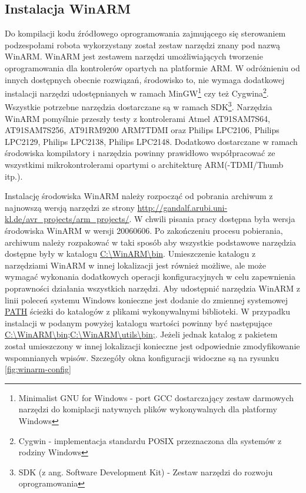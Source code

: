\subsection{Instalacja WinARM}
Do kompilacji kodu źródłowego oprogramowania zajmującego się sterowaniem
podzespołami robota wykorzystany został zestaw narzędzi znany pod nazwą WinARM.
WinARM jest zestawem narzędzi umożliwiających tworzenie oprogramowania dla
kontrolerów opartych na platformie ARM. W odróżnieniu od innych dostępnych
obecnie rozwiązań, środowisko to, nie wymaga dodatkowej instalacji narzędzi
udostępnianych w ramach MinGW\footnote{Minimalist GNU for Windows - port GCC
dostarczający zestaw darmowych narzędzi do komiplacji natywnych plików
wykonywalnych dla platformy Windows} czy też Cygwina\footnote{Cygwin -
implementacja standardu POSIX przeznaczona dla systemów z rodziny Windows}.
Wszystkie potrzebne narzędzia dostarczane są w ramach SDK\footnote{SDK (z ang.
Software Development Kit) - Zestaw narzędzi do rozwoju oprogramowania}. Narzędzia
WinARM pomyślnie przeszły testy z kontrolerami Atmel AT91SAM7S64, AT91SAM7S256,
AT91RM9200 ARM7TDMI oraz Philips LPC2106, Philips LPC2129, Philips LPC2138,
Philips LPC2148. Dodatkowo dostarczane w ramach środowiska kompilatory i
narzędzia powinny prawidłowo współpracować ze wszystkimi mikrokontrolerami
opartymi o architekturę ARM(-TDMI/Thumb itp.).

Instalację środowiska WinARM należy rozpocząć od pobrania archiwum z najnowszą
wersją narzędzi ze strony
\url{http://gandalf.arubi.uni-kl.de/avr_projects/arm_projects/}. W chwili pisania
pracy dostępna była wersja środowiska WinARM w wersji 20060606. Po zakończeniu
procesu pobierania, archiwum należy rozpakować w taki sposób aby wszystkie
podstawowe narzędzia dostępne były w katalogu \url{C:\WinARM\bin}. Umieszczenie
katalogu z narzędziami WinARM w innej lokalizacji jest również możliwe, ale może
wymagać wykonania dodatkowych operacji konfiguracyjnych w celu zapewnienia
poprawności działania wszystkich narzędzi. Aby udostępnić narzędzia WinARM z
linii poleceń systemu Windows konieczne jest dodanie do zmiennej systemowej
\url{PATH} ścieżki do katalogów z plikami wykonywalnymi biblioteki. W przypadku
instalacji w podanym powyżej katalogu wartości powinny być następujące
\url{C:\WinARM\bin;C:\WinARM\utils\bin;}. Jeżeli jednak katalog z pakietem
został umieszczony w innej lokalizacji konieczne jest odpowiednie zmodyfikowanie
wspomnianych wpisów. Szczegóły okna konfiguracji widoczne są na rysunku
\ref{fig:winarm-config}

